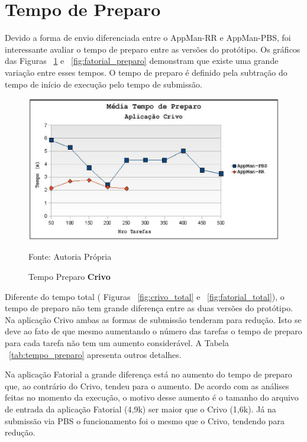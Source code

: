 
\section{Tempo de Preparo}

Devido a forma de envio diferenciada entre o AppMan-RR e AppMan-PBS, foi interessante avaliar o tempo de preparo entre as versões do protótipo. Os gráficos das Figuras ~\ref{fig:crivo_preparo} e ~\ref{fig:fatorial_preparo} demonstram que existe uma grande variação entre esses tempos. O tempo de preparo é definido pela subtração do tempo de início de execução pelo tempo de submissão.

\begin{figure}[hbtp]
\begin{center}
\includegraphics[scale=0.77]{./img/PreparoCrivo.ps}
\caption{Tempo Preparo \textbf{Crivo}}
\label{fig:crivo_preparo}
Fonte: Autoria Própria
\end{center}
\end{figure}


Diferente do tempo total ( Figuras ~\ref{fig:crivo_total} e ~\ref{fig:fatorial_total}), o tempo de preparo não tem grande diferença entre as duas versões do protótipo. Na aplicação Crivo ambas as formas de submissão tenderam para redução. Isto se deve ao fato de que mesmo aumentando o número das tarefas o tempo de preparo para cada tarefa não tem um aumento considerável. A Tabela ~\ref{tab:tempo_preparo} apresenta outros detalhes.

Na aplicação Fatorial a grande diferença está no aumento do tempo de preparo que, ao contrário do Crivo, tendeu para o aumento. De acordo com as análises feitas no momento da execução, o motivo desse aumento é o tamanho do arquivo de entrada da aplicação Fatorial (4,9k) ser maior que o Crivo (1,6k). Já na submissão via PBS o funcionamento foi o mesmo que o Crivo, tendendo para redução. 


